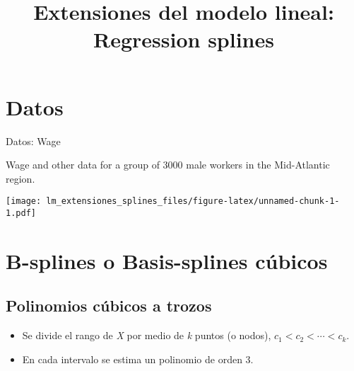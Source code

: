 \documentclass[
]{article}
\title{Extensiones del modelo lineal: Regression splines}
\author{}
\date{\vspace{-2.5em}}
\newenvironment{Shaded}{\begin{snugshade}}{\end{snugshade}}
\newcommand{\DataTypeTok}[1]{\textcolor[rgb]{0.13,0.29,0.53}{#1}}
\newcommand{\DecValTok}[1]{\textcolor[rgb]{0.00,0.00,0.81}{#1}}
\newcommand{\FloatTok}[1]{\textcolor[rgb]{0.00,0.00,0.81}{#1}}
\newcommand{\KeywordTok}[1]{\textcolor[rgb]{0.13,0.29,0.53}{\textbf{#1}}}
\newcommand{\NormalTok}[1]{#1}
\newcommand{\OperatorTok}[1]{\textcolor[rgb]{0.81,0.36,0.00}{\textbf{#1}}}
\newcommand{\StringTok}[1]{\textcolor[rgb]{0.31,0.60,0.02}{#1}}
\providecommand{\tightlist}{%
  \setlength{\itemsep}{0pt}\setlength{\parskip}{0pt}}
\begin{document}
\maketitle

{
\setcounter{tocdepth}{2}
\tableofcontents
}
\hypertarget{datos}{%
\section{Datos}\label{datos}}

Datos: Wage

Wage and other data for a group of 3000 male workers in the Mid-Atlantic
region.

\begin{Shaded}
\end{Shaded}

\texttt{[image: lm\_extensiones\_splines\_files/figure-latex/unnamed-chunk-1-1.pdf]}

\hypertarget{b-splines-o-basis-splines-cuxfabicos}{%
\section{B-splines o Basis-splines
cúbicos}\label{b-splines-o-basis-splines-cuxfabicos}}

\hypertarget{polinomios-cuxfabicos-a-trozos}{%
\subsection{Polinomios cúbicos a
trozos}\label{polinomios-cuxfabicos-a-trozos}}

\begin{itemize}
\tightlist
\item
  Se divide el rango de \emph{X} por medio de \emph{k} puntos (o nodos),
  \(c_1 < c_2 < \cdots < c_k\).
\item
  En cada intervalo se estima un polinomio de orden 3.
\end{itemize}
\end{document}
